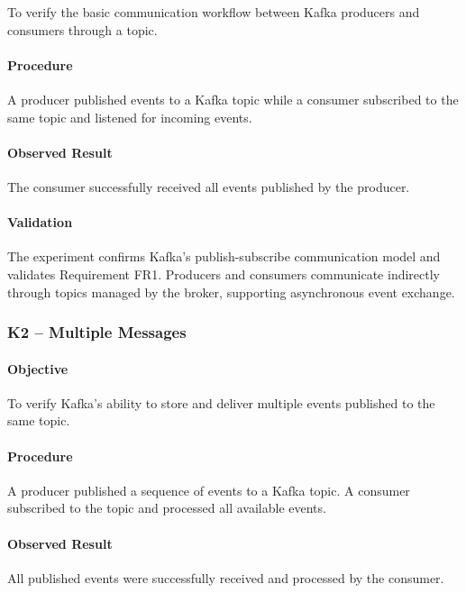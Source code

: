 \documentclass{scrartcl}
\begin{document}
To verify the basic communication workflow between Kafka producers and consumers through a topic.

\paragraph{Procedure}

A producer published events to a Kafka topic while a consumer subscribed to the same topic and listened for incoming events.

\paragraph{Observed Result}

The consumer successfully received all events published by the producer.

\paragraph{Validation}

The experiment confirms Kafka's publish-subscribe communication model and validates Requirement FR1. Producers and consumers communicate indirectly through topics managed by the broker, supporting asynchronous event exchange.

\subsubsection{K2 -- Multiple Messages}

\paragraph{Objective}

To verify Kafka's ability to store and deliver multiple events published to the same topic.

\paragraph{Procedure}

A producer published a sequence of events to a Kafka topic. A consumer subscribed to the topic and processed all available events.

\paragraph{Observed Result}

All published events were successfully received and processed by the consumer.
\end{document}
